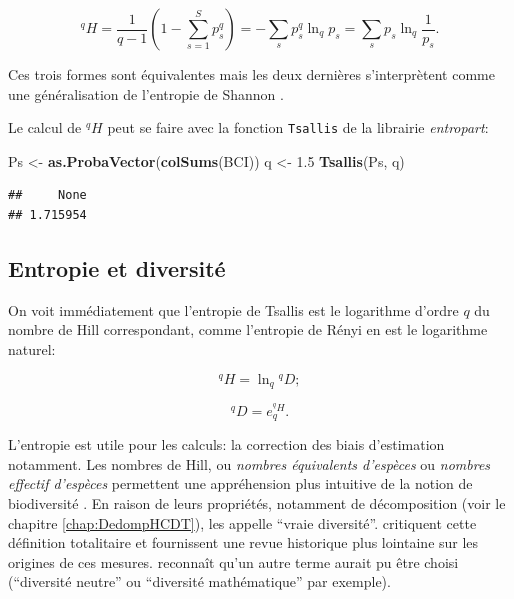 \documentclass[
  11pt,
  french,
  a4paper,
  extrafontsizes,onecolumn,openright
  ]{memoir}
\newenvironment{Shaded}{\begin{snugshade}}{\end{snugshade}}
\newcommand{\FloatTok}[1]{\textcolor[rgb]{0.00,0.00,0.81}{#1}}
\newcommand{\KeywordTok}[1]{\textcolor[rgb]{0.13,0.29,0.53}{\textbf{#1}}}
\newcommand{\NormalTok}[1]{#1}
\newcommand{\StringTok}[1]{\textcolor[rgb]{0.31,0.60,0.02}{#1}}
\begin{document}
\begin{equation}
  \label{eq:EntropieHCDT}
  ^{q}\!H = \frac{1}{q-1}\left(1-\sum^S_{s=1}{p^q_s}\right)=-\sum_s{p^q_s}\ln_q{p_s}=\sum_s{p_s}\ln_q\frac{1}{p_s}.
\end{equation}

Ces trois formes sont équivalentes mais les deux dernières s'interprètent comme une généralisation de l'entropie de Shannon \autocite{Marcon2014a}.

Le calcul de \(^{q}\!H\) peut se faire avec la fonction \texttt{Tsallis} de la librairie \emph{entropart}:

\scriptsize

\begin{Shaded}
\begin{Highlighting}[]
\NormalTok{Ps <-}\StringTok{ }\KeywordTok{as.ProbaVector}\NormalTok{(}\KeywordTok{colSums}\NormalTok{(BCI))}
\NormalTok{q <-}\StringTok{ }\FloatTok{1.5}
\KeywordTok{Tsallis}\NormalTok{(Ps, q)}
\end{Highlighting}
\end{Shaded}

\begin{verbatim}
##     None 
## 1.715954
\end{verbatim}

\normalsize

\hypertarget{entropie-et-diversituxe9}{%
\subsection{Entropie et diversité}\label{entropie-et-diversituxe9}}

On voit immédiatement que l'entropie de Tsallis est le logarithme d'ordre \(q\) du nombre de Hill correspondant, comme l'entropie de Rényi en est le logarithme naturel:

\begin{equation}
  \label{eq:HlnD}
  ^{q}\!H = \ln_q{^{q}\!D};
\end{equation}

\begin{equation}
  \label{eq:DexpH}
  ^{q}\!D = e_q^{^{q}\!H}.
\end{equation}

L'entropie est utile pour les calculs: la correction des biais d'estimation notamment.
Les nombres de Hill, ou \emph{nombres équivalents d'espèces} ou \emph{nombres effectif d'espèces} permettent une appréhension plus intuitive de la notion de biodiversité \autocite{Jost2006}.
En raison de leurs propriétés, notamment de décomposition (voir le chapitre \ref{chap:DedompHCDT}), \textcite{Jost2007} les appelle ``vraie diversité''.
\textcite{Hoffmann2008} critiquent cette définition totalitaire et fournissent une revue historique plus lointaine sur les origines de ces mesures.
\textcite{Jost2009} reconnaît qu'un autre terme aurait pu être choisi (``diversité neutre'' ou ``diversité mathématique'' par exemple).
\end{document}
